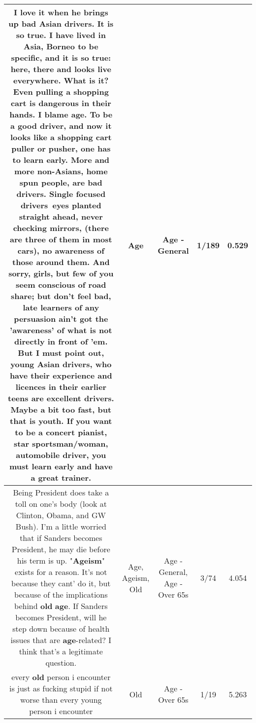 \documentclass[11pt]{article}
\newlength\mylength
\begin{document}
\begin{center}
\begin{longtable}{|C{.65\mylength}|C{.30\mylength}|C{.12\mylength}|C{.12\mylength}|C{.12\mylength}|}
  \small I love it when he brings up bad Asian drivers. It is so true. I have lived in Asia, Borneo to be specific, and it is so true: here, there and looks live everywhere. What is it? Even pulling a shopping cart is dangerous in their hands.    I blame \textbf{age}. To be a good driver, and now it looks like a shopping cart puller or pusher, one has to learn early. More and more non-Asians, home spun people, are bad drivers. Single focused drivers~eyes planted straight ahead, never checking mirrors, (there are three of them in most cars), no awareness of those around them. And sorry, girls, but few of you seem conscious of road share; but don't feel bad, late learners of any persuasion ain't got the 'awareness' of what is not directly in front of 'em.    But I must point out, young Asian drivers, who have their experience and licences in their earlier teens are excellent drivers. Maybe a bit too fast, but that is youth.   If you want to be a concert pianist, star sportsman/woman, automobile driver, you must learn early and have a great trainer.\normalsize   & Age & Age - General & 1/189 & 0.529 \\  \hline
  \small Being President does take a toll on one's body (look at Clinton, Obama, and GW Bush). I'm a little worried that if Sanders becomes President, he may die before his term is up. "\textbf{Ageism}" exists for a reason. It's not because they cant' do it, but because of the implications behind \textbf{old} \textbf{age}. If Sanders becomes President, will he step down because of health issues that are \textbf{age}-related? I think that's a legitimate question.\normalsize   & Age, Ageism, Old & Age - General, Age - Over 65s & 3/74 & 4.054 \\  \hline
  \small every \textbf{old} person i encounter is just as fucking stupid if not worse than every young person i encounter\normalsize   & Old & Age - Over 65s & 1/19 & 5.263 \\  \hline

\end{longtable}
\end{center}
\end{document}
